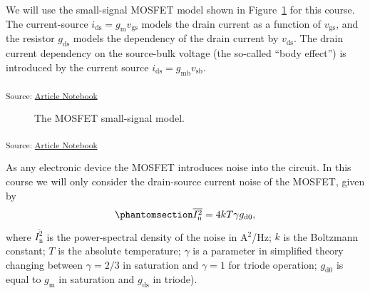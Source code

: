 \documentclass[
  a4paper,
  DIV=11,
  numbers=noendperiod]{scrartcl}
\begin{document}
We will use the small-signal MOSFET model shown in
Figure~\ref{fig-mosfet-small-signal-model} for this course. The
current-source \(i_\mathrm{ds}= g_\mathrm{m}v_\mathrm{gs}\) models the
drain current as a function of \(v_\mathrm{gs}\), and the resistor
\(g_\mathrm{ds}\) models the dependency of the drain current by
\(v_\mathrm{ds}\). The drain current dependency on the source-bulk
voltage (the so-called ``body effect'') is introduced by the current
source \(i_\mathrm{ds}= g_\mathrm{mb} v_\mathrm{sb}\).

\textsubscript{Source:
\href{https://iic-jku.github.io/analog-circuit-design/index.qmd.html}{Article
Notebook}}

\begin{figure}[H]


\caption{\label{fig-mosfet-small-signal-model}The MOSFET small-signal
model.}

\end{figure}%

\textsubscript{Source:
\href{https://iic-jku.github.io/analog-circuit-design/index.qmd.html}{Article
Notebook}}

As any electronic device the MOSFET introduces noise into the circuit.
In this course we will only consider the drain-source current noise of
the MOSFET, given by
\begin{equation}\phantomsection\label{eq-mosfet-noise}{
\overline{I_\mathrm{n}^2} = 4 k T \gamma g_\mathrm{d0},
}\end{equation} where \(\overline{I_\mathrm{n}^2}\) is the
power-spectral density of the noise in A\(^2\)/Hz; \(k\) is the
Boltzmann constant; \(T\) is the absolute temperature; \(\gamma\) is a
parameter in simplified theory changing between \(\gamma = 2/3\) in
saturation and \(\gamma =1\) for triode operation; \(g_\mathrm{d0}\) is
equal to \(g_\mathrm{m}\) in saturation and \(g_\mathrm{ds}\) in
triode).
\end{document}

